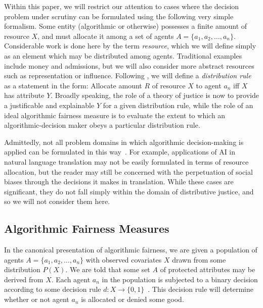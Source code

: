 Within this paper, we will restrict our attention to cases where the decision
problem under scrutiny can be formulated using the following very simple
formalism. Some entity (algorithmic or otherwise) possesses a finite amount of
resource $X$, and must allocate it among a set of agents
$A = \{a_1, a_2, \ldots, a_n\}$. Considerable work is done here by the term 
\textit{resource}, which we will define simply as an element which may be 
distributed among agents. Traditional examples include money and admissions,
but we will also consider more abstract resources such as representation or
influence. Following \cite{Kuppler_2021}, we will define a \textit{distribution
rule} as a statement in the form: Allocate amount $R$ of resource $X$ to agent
$a_n$ iff $X$ has attribute $Y$. Broadly speaking, the role of a theory of
justice is now to provide a justificable and explainable $Y$ for a given
distribution rule, while the role of an ideal algorithmic fairness measure is to
evaluate the extent to which an algorithmic-decision maker obeys a particular
distribution rule.

Admittedly, not all problem domains in which algorithmic decision-making is
applied can be formulated in this way~\cite{Green_2017}. For example,
applications of AI in natural language translation may not be easily formulated
in terms of resource allocation, but the reader may still be concerned with the
perpetuation of social biases through the decisions it makes in translation.
While these cases are significant, they do not fall simply within the domain of
distributive justice, and so we will not consider them here.

\subsection{Algorithmic Fairness Measures}\label{sec:fairness-measures}
In the canonical presentation of algorithmic fairness, we are given a population
of agents $A = \{a_1, a_2, \ldots, a_n\}$ with observed covariates $X$ drawn
from some distribution $P(X)$. We are told that some set $A$ of protected 
attributes may be derived from $X$. Each agent $a_n$ in the population is
subjected to a binary decision according to some decision rule
$d: X \to \{0, 1\}$~\cite{CorbettDavies_2023}. This decision rule will determine
whether or not agent $a_n$ is allocated or denied some good.

